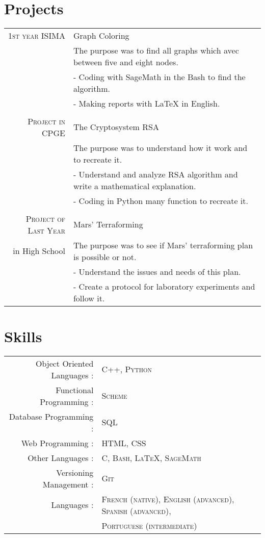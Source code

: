 \documentclass[a4paper,10pt]{article}
\begin{document}
\section{\\\\\\Projects}
\begin{tabular}{rl}	
\textsc{1st year ISIMA} & Graph Coloring 
\\&\footnotesize{The purpose was to find all graphs which avec between five and eight nodes.} 
\\ &\footnotesize{ - Coding with SageMath in the Bash to find the algorithm.}
\\ &\footnotesize{ - Making reports with LaTeX in English.}
\\\\\textsc{Project in CPGE} & The Cryptosystem RSA
\\&\footnotesize{The purpose was to understand how it work and to recreate it.} 
\\ &\footnotesize{ - Understand and analyze RSA algorithm and write a mathematical explanation.}
\\ &\footnotesize{ - Coding in Python many function to recreate it.} \\\\
\textsc{Project of Last Year} & Mars' Terraforming 
\\ in High School &\footnotesize{The purpose was to see if Mars' terraforming plan is possible or not.} 
\\ &\footnotesize{ - Understand the issues and needs of this plan.}
\\ &\footnotesize{ - Create a protocol for laboratory experiments and follow it.} \\
\end{tabular}
\newpage
\section{Skills}
\begin{tabular}{rl}
Object Oriented Languages :& \textsc{C++, Python}\\
Functional Programming :& \textsc{Scheme}\\
Database Programming :& \textsc{SQL}\\
Web Programming :& \textsc{HTML, CSS} \\
Other Languages :& \textsc{C, Bash, LaTeX, SageMath}\\
Versioning Management :& \textsc{Git} \\
Languages :& \textsc{French (native), English (advanced), Spanish (advanced),} \\& \textsc{Portuguese (intermediate)}
\end{tabular}
\end{document}
